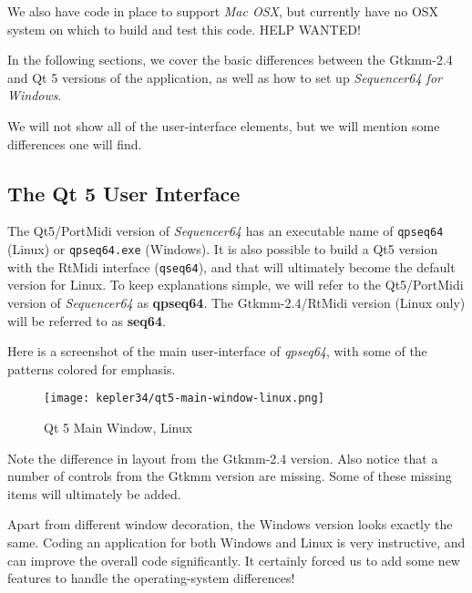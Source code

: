    We also have code in place to support
   \textsl{Mac OSX},
   but currently have no OSX system on which to build and test this
   code.  HELP WANTED!

   In the following sections, we cover the basic differences between the
   Gtkmm-2.4 and Qt 5 versions of the application, as well as how to set up
   \textsl{Sequencer64 for Windows}.

   We will not show all of the user-interface elements, but we will mention
   some differences one will find.

\subsection{The Qt 5 User Interface}
\label{subsec:qt_portmidi_qt5_user_interface}

   The Qt5/PortMidi version of \textsl{Sequencer64} has an executable name of
   \texttt{qpseq64} (Linux) or \texttt{qpseq64.exe} (Windows).
   It is also possible to build a Qt5 version with the RtMidi interface
   (\texttt{qseq64}), and
   that will ultimately become the default version for Linux.
   To keep explanations simple, we will refer to the Qt5/PortMidi version of
   \textsl{Sequencer64} as \textbf{qpseq64}.
   The Gtkmm-2.4/RtMidi version (Linux only) will be referred to as
   \textbf{seq64}.

   Here is a screenshot of the main user-interface of \textsl{qpseq64}, with
   some of the patterns colored for emphasis.

\begin{figure}[H]
   \centering 
   \texttt{[image: kepler34/qt5-main-window-linux.png]}
   \caption{Qt 5 Main Window, Linux}
   \label{fig:qt5_main_window_linux}
\end{figure}

   Note the difference in layout from the Gtkmm-2.4 version.
   Also notice that a number of controls from the Gtkmm version are missing.
   Some of these missing items will ultimately be added.

%

   Apart from different window decoration, the Windows version looks exactly
   the same.  Coding an application for both Windows and Linux is very
   instructive, and can improve the overall code significantly.  It certainly
   forced us to add some new features to handle the operating-system
   differences!

